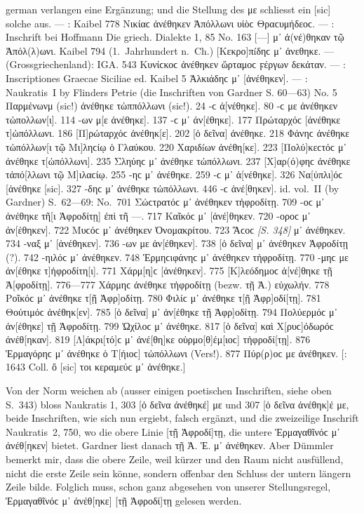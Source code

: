 \begin{otherlanguage*}{german}
verlangen eine Ergänzung; und die Stellung des με schliesst ein [sic] solche aus. —  : Kaibel 778 Νικίαϲ  ἀνέθηκεν Ἀπόλλωνι υἱὸϲ Θραϲυμήδεοϲ. — : Inschrift bei Hoffmann Die griech. Dialekte 1, 85 No. 163 [—] μ᾽ ἀ(νέ)θηκαν τῷ Ἀπόλ(λ)ωνι. Kaibel 794 (1.~Jahrhundert n.~Ch.) [Κεκρο]πíδηϲ μ᾽ ἀνεθηκε. —  (Grossgriechenland): IGA. 543 Κυνίϲκοϲ  ἀνέθηκεν ὥρταμοϲ ϝέργων δεκάταν. — : Inscriptiones Graecae Siciliae ed. Kaibel 5 Ἀλκιάδηϲ μ᾽ [ἀνέθηκεν]. — : Naukratis~I by Flinders Petrie (die Inschriften von Gardner S. 60—63) No. 5 Παρμένωνμ (sic!)  ἀνέθηκε τὠππόλλωνι (sic!). 24 -ϲ  ἀ[νέθηκε]. 80 -ϲ με ἀνέθηκεν τὠπολλων[ι]. 114 -ων μ[ε ἀνέθηκε]. 137 -ϲ μ᾽ ἀν[έθηκε]. 177 Πρώταρχόϲ  [ἀνέθηκε τ]ὠπόλλωνι. 186 [Π]ρώταρχόϲ  ἀνέθηκ[ε]. 202 [ὁ δεῖνα]  ἀνέθηκε. 218 Φάνηϲ  ἀνέθηκε τὠπόλλων[ι τῷ Μι]ληϲίῳ ὁ Γλαύκου. 220 Χαριδíων  ἀνέθη[κε]. 223 [Πολύ]κεϲτόϲ μ᾽ ἀνέθηκε τ[ὠπόλλωνι]. 235 Σληύηϲ μ᾽ ἀνέθηκε τὠπόλλωνι. 237 [Χ]αρ(ό)φηϲ  ἀνέθηκε τἀπό[λλωνι τῷ Μ]ιλαϲίῳ. 255 -ηϲ μ᾽ ἀνέθηκε. 259 -ϲ μ᾽ ἀ[νέθηκε]. 326 Να[ύπλι]όϲ  [ἀνέθηκε [sic]. 327 -δηϲ μ᾽ ἀνέθηκε τὠπόλλωνι. 446 -ϲ  ἀνέ[θηκεν]. id. vol.~II (by Gardner) S.~62—69: No.~701 Σώϲτρατόϲ μ᾽ ἀνέθηκεν τἠφροδίτῃ. 709 -οϲ μ᾽ ἀνέθηκε τῆ[ι Ἀφροδίτῃ] ἐπὶ τῆ —. 717 Καῖκόϲ μ᾽ [ἀνέ]θηκεν. 720 -οροϲ μ᾽ ἀν[έθηκεν]. 722 Μυϲόϲ μ᾽ ἀνέθηκεν Ὀνομακρίτου. 723 Ἄϲοϲ \hypertarget{p348}{\emph{[S. 348]}}\label{p348} μ᾽ ἀνέθηκεν. 734 -ναξ μ᾽ [ἀνέθηκεν]. 736 -ων με ἀν[έθηκεν]. 738 [ὁ δεῖνα] μ᾽ ἀνέθηκεν Ἀφροδίτῃ (?). 742 -ηιλόϲ μ᾽ ἀνέθηκεν. 748 Ἑρμηϲιφάνηϲ μ᾽ ἀνέθηκεν τἠφροδίτῃ. 770 -μηϲ με ἀν[έθηκε τ]ἠφροδίτη[ι]. 771 Χάρμ[η]ϲ  [ἀνέθηκεν]. 775 [Κ]λεόδημοϲ  ἀ[νέ]θηκε τῇ Ἀ[φροδίτῃ]. 776—777 Χάρμηϲ  ἀνέθηκε τἠφροδίτῃ (bezw. τῇ Ἀ.) εὐχωλήν. 778 Ροῖκόϲ μ᾽ ἀνέθηκε τ[ῇ Ἀφρ]οδίτῃ. 780 Φιλίϲ μ᾽ ἀνέθηκε τ[ῇ Ἀφρ]οδί[τῃ]. 781 Θούτιμόϲ  ἀνέθηκ[εν]. 785 [ὁ δεῖνα] μ᾽ ἀν[έθηκε τῇ Ἀφρ]οδίτῃ. 794 Πολύερμόϲ μ᾽ ἀν[έθηκε] τῇ Ἀφροδίτῃ. 799 Ὠχίλοϲ μ᾽ ἀνέθηκε. 817 [ὁ δεῖνα] καὶ Χ[ρυϲ]όδωρόϲ  ἀνέθ[ηκαν]. 819 [Λ]άκρι[τό]ϲ μ᾽ ἀνέ[θη]κε οὑρμο[θ]έμ[ιοϲ] τἠφροδί[τῃ]. 876 Ἑρμαγόρηϲ μ᾽ ἀνέ\-θηκε ὁ Τ[ήιοϲ] τὠπόλλωνι (Vers!). 877 Πύρ(ρ)οϲ με ἀνέθηκεν. [: 1643 Coll. ὄ [sic] τοι κεραμεύϲ μ᾽ ἀνέθηκε.]

Von der Norm weichen ab (ausser einigen poetischen Inschriften, siehe oben S.~343) bloss Naukratis 1, 303 [ὁ δεῖνα ἀνέθηκέ] με und 307 [ὁ δεῖνα ἀνέθηκ]έ με, beide Inschriften, wie sich nun ergiebt, falsch ergänzt, und die zweizeilige Inschrift Naukratis~2, 750, wo die obere Linie [τῇ Ἀφροδί]τῃ, die untere Ἑρμαγα\-θῖνόϲ μ᾽ ἀνέθ[ηκεν] bietet. Gardner liest danach τῇ Ἀ. Ἑ. μ᾽ ἀνέθηκεν. Aber Dümmler bemerkt mir, dass die obere Zeile, weil kürzer und den Raum nicht ausfüllend, nicht die erste Zeile sein könne, sondern offenbar den Schluss der untern längern Zeile bilde. Folglich muss, schon ganz abgesehen von unserer Stellungsregel, Ἑρμαγαθῖνόϲ μ᾽ ἀνέθ[ηκε] [τῇ Ἀφροδί]τῃ gelesen werden.


\end{otherlanguage*}
